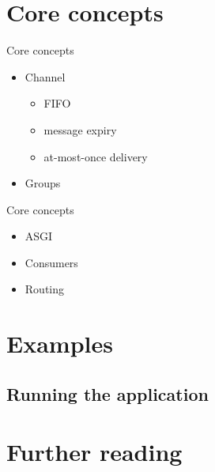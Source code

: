 \documentclass{beamer}
\begin{document}
\section{Core concepts}

\begin{frame}{Core concepts}
	\begin{adjustwidth}{2em}{2.5em}
	\begin{itemize}
		\item Channel
			\begin{itemize}
				\item FIFO
				\item message expiry
				\item at-most-once delivery
			\end{itemize}
		\item Groups
	\end{itemize}
	\end{adjustwidth}
\end{frame}

\begin{frame}{Core concepts}
	\begin{adjustwidth}{2em}{2.5em}
	\begin{itemize}
		\item ASGI
		\item Consumers
		\item Routing
	\end{itemize}
	\end{adjustwidth}
\end{frame}

\section{Examples}

\subsection{Running the application}

\section{Further reading}
\end{document}
